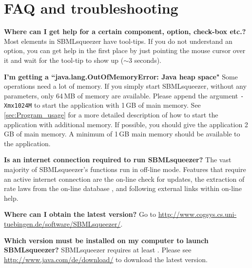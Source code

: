 \chapter{\acs{FAQ} and troubleshooting}
\label{ch:faq}


\noindent \textbf{Where can I get help for a certain component, option, check-box etc.?}\newline
Most elements in SBMLsqueezer have tool-tips. If you do not understand an option, you
can get help in the first place by just pointing the mouse cursor over it and
wait for the tool-tip to show up ($\sim$3 seconds).\newline

\noindent \textbf{I'm getting a ``java.lang.OutOfMemoryError: Java heap space"}\newline
Some operations need a lot of memory. If you simply start SBMLsqueezer, without any
\JVM parameters, only 64\,MB of memory are available. Please append the argument
\texttt{-Xmx1024M} to start the application with 1\,GB of main memory. See
\vref{sec:Program_usage} for a more detailed description of how to
start the application with additional memory. If possible, you should give the
application 2\,GB of main memory. A minimum of 1\,GB main memory should be
available to the application.\newline

\noindent \textbf{Is an internet connection required to run SBMLsqueezer?}\newline
The vast majority of SBMLsqueezer's functions run in off-line mode.
Features that require an active internet connection are the on-line check for updates, the extraction of rate laws from the on-line database \SABIO, and following external links within on-line help.
\newline

\noindent \textbf{Where can I obtain the latest version?}\newline
Go to \url{http://www.cogsys.cs.uni-tuebingen.de/software/SBMLsqueezer/}.\newline

\noindent \textbf{Which \Java version must be installed on my computer to launch SBMLsqueezer?}\newline
SBMLsqueezer requires at least . Please see \url{http://www.java.com/de/download/} to download the latest \Java version.\newline

